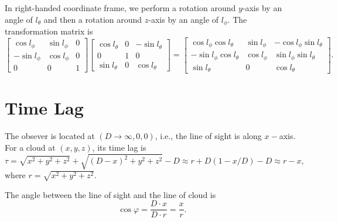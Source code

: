 \documentclass[oneside]{book}
\begin{document}
In right-handed coordinate frame, we perform a rotation around $y$-axis by an angle of $l_\theta$ and 
then a rotation around $z$-axis by an angle of $l_\phi$. The transformation matrix is
\begin{equation}
\left[\begin{array}{ccc}
\cos l_\phi & \sin l_\phi & 0 \\
-\sin l_\phi &  \cos l_\phi & 0 \\
     0      &      0       & 1 
\end{array}\right]
\left[\begin{array}{ccc}
\cos l_\theta  & 0  & -\sin l_\theta\\
   0      &      1        &  0  \\
\sin l_\theta &  0  & \cos l_\theta 
\end{array}\right]=
\left[\begin{array}{ccc}
\cos l_\phi\cos l_\theta  & \sin l_\phi  & -\cos l_\phi\sin l_\theta\\
-\sin l_\phi\cos l_\theta      & \cos l_\phi        &  \sin l_\phi\sin l_\theta  \\
\sin l_\theta &  0  & \cos l_\theta 
\end{array}\right]
.
\end{equation}

\section{Time Lag}
The obsever is located at $(D\rightarrow\infty, 0, 0)$, i.e., the line of sight is along $x-$axis. 
For a cloud at $(x, y, z)$, its time lag is
\begin{equation}
\tau =\sqrt{x^2+y^2+z^2} + \sqrt{(D-x)^2+y^2+z^2} - D \approx r + D(1-x/D) - D \approx r - x,
\end{equation}
where $r=\sqrt{x^2+y^2+z^2}$.

The angle between the line of sight and the line of cloud is
\begin{equation}
 \cos \varphi = \frac{D\cdot x}{D\cdot r} = \frac{x}{r}.
\end{equation}
\end{document}
